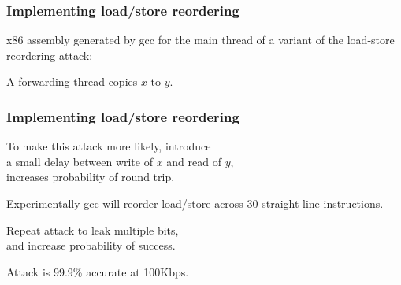 \documentclass{beamer}
\begin{document}
\begin{frame}
  \frametitle{Implementing load/store reordering}

  x86 assembly generated by gcc for the main thread of a variant of the load-store reordering attack:
  \bigskip
  

\bigskip
  A forwarding thread copies $x$ to $y$.

\end{frame}

\begin{frame}
  \frametitle{Implementing load/store reordering}

  To make this attack more likely, introduce\\
  a small delay between write of $x$ and read of $y$,\\
  increases probability of round trip.

  \bigskip
  Experimentally gcc will reorder load/store
  across 30 straight-line instructions.

  \bigskip
  Repeat attack to leak multiple bits,\\
  and increase probability of success.
  
  \bigskip
  Attack is 99.9\% accurate at 100Kbps.

\end{frame}
\end{document}
